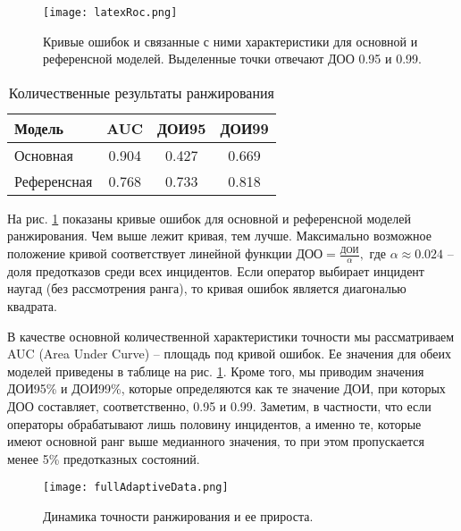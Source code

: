 \begin{figure}[thb]
\centering
\texttt{[image: latexRoc.png]}
\caption{Кривые ошибок и связанные с ними характеристики для основной и референсной моделей. Выделенные точки отвечают ДОО 0.95 и  0.99.}\label{fig:ROCcurves}
\end{figure}

\begin{table} [htbp]
  \label{tbl:aucresults}
  \centering
  \caption{Количественные результаты ранжирования}\label{Ts0Sib}%
\begin{tabular}{ l c c c}
\toprule
Модель & AUC & ДОИ95 & ДОИ99 \\ \midrule
Основная & 0.904& 0.427 & 0.669 \\
Референсная & 0.768 & 0.733 & 0.818\\
\bottomrule
\end{tabular}
\end{table}

На рис. \ref{fig:ROCcurves} показаны кривые ошибок для основной и референсной моделей ранжирования. Чем выше лежит кривая, тем лучше. Максимально возможное положение кривой соответствует линейной функции $\text{ДОО}=\frac{ДОИ}{\alpha},$ где $\alpha\approx 0.024$ -- доля предотказов среди всех инцидентов. Если оператор выбирает инцидент наугад (без рассмотрения ранга), то кривая ошибок является диагональю квадрата.

В качестве основной количественной характеристики точности мы рассматриваем AUC (Area Under Curve) -- площадь под кривой ошибок. Ее значения для обеих моделей приведены в таблице на рис. \ref{fig:ROCcurves}. Кроме того, мы приводим значения ДОИ95\% и ДОИ99\%, которые определяются как те значение ДОИ, при которых ДОО составляет, соответственно, 0.95 и 0.99. Заметим, в частности, что если операторы обрабатывают лишь половину инцидентов, а именно те, которые имеют основной ранг выше медианного значения, то при этом пропускается менее 5\% предотказных состояний.


\begin{figure}[thpb]
\caption{Динамика точности ранжирования и ее прироста.}
\label{fig:adaptiveAdditionScores}
\texttt{[image: fullAdaptiveData.png]}
\end{figure}



